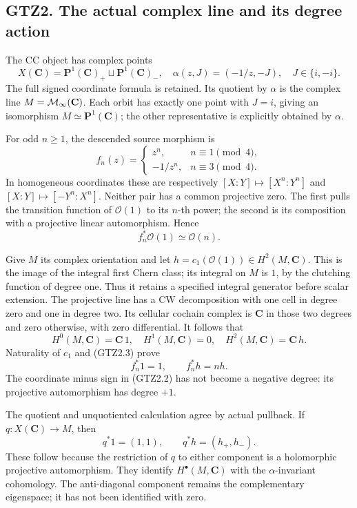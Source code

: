 \subsection{GTZ2. The actual complex line and its degree
action}\label{gtz2.-the-actual-complex-line-and-its-degree-action}

The CC object has complex points \[
X(\mathbf C)=\mathbf P^1(\mathbf C)_+\sqcup\mathbf P^1(\mathbf C)_-,
\quad
\alpha(z,J)=(-1/z,-J),\quad J\in\{i,-i\}.
\tag{GTZ2.1}
\] The full signed coordinate formula is retained. Its quotient by
\(\alpha\) is the complex line \(M=\mathcal M_\infty(\mathbf C)\). Each orbit has
exactly one point with \(J=i\), giving an isomorphism
\(M\simeq\mathbf P^1(\mathbf C)\); the other representative is
explicitly obtained by \(\alpha\).

For odd \(n\ge1\), the descended source morphism is \[
f_n(z)=
\begin{cases}
z^n,&n\equiv1\pmod4,\\
-1/z^n,&n\equiv3\pmod4.
\end{cases}
\tag{GTZ2.2}
\] In homogeneous coordinates these are respectively
\([X:Y]\mapsto[X^n:Y^n]\) and \([X:Y]\mapsto[-Y^n:X^n]\). Neither pair
has a common projective zero. The first pulls the transition function of
\(\mathcal O(1)\) to its \(n\)-th power; the second is its composition
with a projective linear automorphism. Hence \[
f_n^*\mathcal O(1)\simeq\mathcal O(n).
\tag{GTZ2.3}
\]

Give \(M\) its complex orientation and let
\(h=c_1(\mathcal O(1))\in H^2(M,\mathbf C)\). This is the image of the
integral first Chern class; its integral on \(M\) is \(1\), by the
clutching function of degree one. Thus it retains a specified integral
generator before scalar extension. The projective line has a CW
decomposition with one cell in degree zero and one in degree two. Its
cellular cochain complex is \(\mathbf C\) in those two degrees and zero
otherwise, with zero differential. It follows that \[
H^0(M,\mathbf C)=\mathbf C\,1,\quad
H^1(M,\mathbf C)=0,\quad
H^2(M,\mathbf C)=\mathbf C\,h.
\tag{GTZ2.4}
\] Naturality of \(c_1\) and (GTZ2.3) prove \[
f_n^*1=1,\qquad f_n^*h=n h.
\tag{GTZ2.5}
\] The coordinate minus sign in (GTZ2.2) has not become a negative
degree: its projective automorphism has degree \(+1\).

The quotient and unquotiented calculation agree by actual pullback. If
\(q:X(\mathbf C)\to M\), then \[
q^*1=(1,1),\qquad q^*h=(h_+,h_-).
\tag{GTZ2.6}
\] These follow because the restriction of \(q\) to either component is
a holomorphic projective automorphism. They identify
\(H^\bullet(M,\mathbf C)\) with the \(\alpha\)-invariant cohomology. The
anti-diagonal component remains the complementary eigenspace; it has not
been identified with zero.

